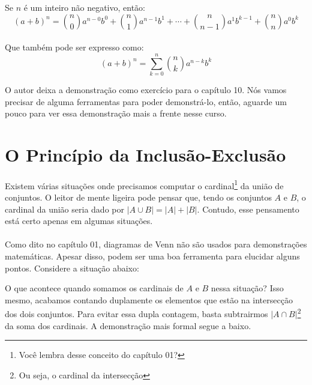 \documentclass[main.tex]{subfiles}
\begin{document}
\begin{theorem}
Se $n$ é um inteiro não negativo, então:
$$(a+b)^n = {n \choose 0}a^{n-0}b^{0} + {n \choose 1}a^{n-1}b^1 + \cdots + {n \choose n-1}a^1b^{k-1} + {n \choose n}a^{0}b^k $$
\\
Que também pode ser expresso como:
$$(a+b)^n = \sum\limits_{k=0}^n {n \choose k}a^{n-k}b^k$$
\end{theorem}

O autor deixa a demonstração como exercício para o capítulo 10. Nós vamos precisar de alguma ferramentas para poder demonstrá-lo, então, aguarde um pouco para ver essa demonstração mais a frente nesse curso.

\section{O Princípio da Inclusão-Exclusão}

Existem várias situações onde precisamos computar o cardinal\footnote{Você lembra desse conceito do capítulo 01?} da união de conjuntos. O leitor de mente ligeira pode pensar que, tendo os conjuntos $A$ e $B$, o cardinal da união seria dado por $|A \cup B| = |A| + |B|$. Contudo, esse pensamento está certo apenas em algumas situações.
\\~\\
Como dito no capítulo 01, diagramas de Venn não são usados para demonstrações matemáticas. Apesar disso, podem ser uma boa ferramenta para elucidar alguns pontos. Considere a situação abaixo:

\begin{center}
\end{center}

O que acontece quando somamos os cardinais de $A$ e $B$ nessa situação? Isso mesmo, acabamos contando duplamente os elementos que estão na intersecção dos dois conjuntos. Para evitar essa dupla contagem, basta subtrairmos $|A \cap B|$\footnote{Ou seja, o cardinal da intersecção} da soma dos cardinais. A demonstração mais formal segue a baixo.
\end{document}
